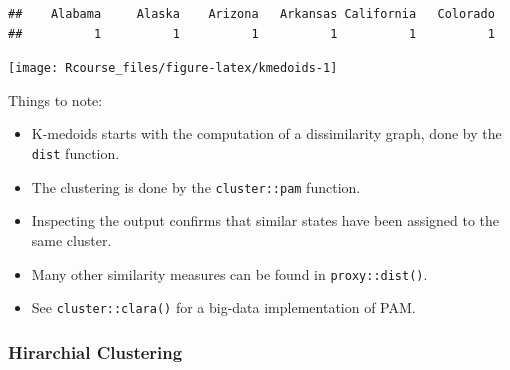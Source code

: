 \documentclass[]{book}
\newenvironment{Shaded}{\begin{snugshade}}{\end{snugshade}}
\newcommand{\KeywordTok}[1]{\textcolor[rgb]{0.13,0.29,0.53}{\textbf{#1}}}
\newcommand{\DataTypeTok}[1]{\textcolor[rgb]{0.13,0.29,0.53}{#1}}
\newcommand{\DecValTok}[1]{\textcolor[rgb]{0.00,0.00,0.81}{#1}}
\newcommand{\FloatTok}[1]{\textcolor[rgb]{0.00,0.00,0.81}{#1}}
\newcommand{\StringTok}[1]{\textcolor[rgb]{0.31,0.60,0.02}{#1}}
\newcommand{\OperatorTok}[1]{\textcolor[rgb]{0.81,0.36,0.00}{\textbf{#1}}}
\newcommand{\NormalTok}[1]{#1}
\providecommand{\tightlist}{%
  \setlength{\itemsep}{0pt}\setlength{\parskip}{0pt}}
\theoremstyle{definition}
\theoremstyle{definition}
\theoremstyle{definition}
\theoremstyle{remark}
\begin{document}
\begin{verbatim}
##    Alabama     Alaska    Arizona   Arkansas California   Colorado 
##          1          1          1          1          1          1
\end{verbatim}

\begin{Shaded}
\end{Shaded}

\texttt{[image: Rcourse\_files/figure-latex/kmedoids-1]}

Things to note:

\begin{itemize}
\tightlist
\item
  K-medoids starts with the computation of a dissimilarity graph, done
  by the \texttt{dist} function.
\item
  The clustering is done by the \texttt{cluster::pam} function.
\item
  Inspecting the output confirms that similar states have been assigned
  to the same cluster.
\item
  Many other similarity measures can be found in \texttt{proxy::dist()}.
\item
  See \texttt{cluster::clara()} for a big-data implementation of PAM.
\end{itemize}

\subsubsection{Hirarchial Clustering}\label{hirarchial-clustering-1}
\end{document}
